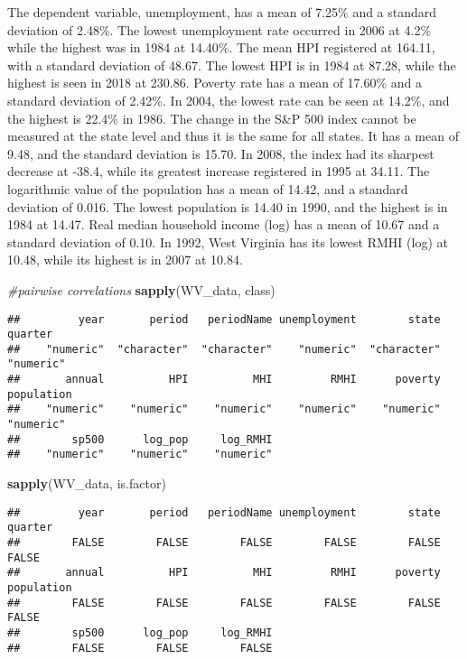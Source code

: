 \documentclass[
]{article}
\newenvironment{Shaded}{\begin{snugshade}}{\end{snugshade}}
\newcommand{\CommentTok}[1]{\textcolor[rgb]{0.56,0.35,0.01}{\textit{#1}}}
\newcommand{\KeywordTok}[1]{\textcolor[rgb]{0.13,0.29,0.53}{\textbf{#1}}}
\newcommand{\NormalTok}[1]{#1}
\begin{document}
The dependent variable, unemployment, has a mean of 7.25\% and a
standard deviation of 2.48\%. The lowest unemployment rate occurred in
2006 at 4.2\% while the highest was in 1984 at 14.40\%. The mean HPI
registered at 164.11, with a standard deviation of 48.67. The lowest HPI
is in 1984 at 87.28, while the highest is seen in 2018 at 230.86.
Poverty rate has a mean of 17.60\% and a standard deviation of 2.42\%.
In 2004, the lowest rate can be seen at 14.2\%, and the highest is
22.4\% in 1986. The change in the S\&P 500 index cannot be measured at
the state level and thus it is the same for all states. It has a mean of
9.48, and the standard deviation is 15.70. In 2008, the index had its
sharpest decrease at -38.4, while its greatest increase registered in
1995 at 34.11. The logarithmic value of the population has a mean of
14.42, and a standard deviation of 0.016. The lowest population is 14.40
in 1990, and the highest is in 1984 at 14.47. Real median household
income (log) has a mean of 10.67 and a standard deviation of 0.10. In
1992, West Virginia has its lowest RMHI (log) at 10.48, while its
highest is in 2007 at 10.84.

\begin{Shaded}
\begin{Highlighting}[]
\CommentTok{#pairwise correlations}
\KeywordTok{sapply}\NormalTok{(WV_data, class)}
\end{Highlighting}
\end{Shaded}

\begin{verbatim}
##         year       period   periodName unemployment        state      quarter 
##    "numeric"  "character"  "character"    "numeric"  "character"    "numeric" 
##       annual          HPI          MHI         RMHI      poverty   population 
##    "numeric"    "numeric"    "numeric"    "numeric"    "numeric"    "numeric" 
##        sp500      log_pop     log_RMHI 
##    "numeric"    "numeric"    "numeric"
\end{verbatim}

\begin{Shaded}
\begin{Highlighting}[]
\KeywordTok{sapply}\NormalTok{(WV_data, is.factor)}
\end{Highlighting}
\end{Shaded}

\begin{verbatim}
##         year       period   periodName unemployment        state      quarter 
##        FALSE        FALSE        FALSE        FALSE        FALSE        FALSE 
##       annual          HPI          MHI         RMHI      poverty   population 
##        FALSE        FALSE        FALSE        FALSE        FALSE        FALSE 
##        sp500      log_pop     log_RMHI 
##        FALSE        FALSE        FALSE
\end{verbatim}
\end{document}
